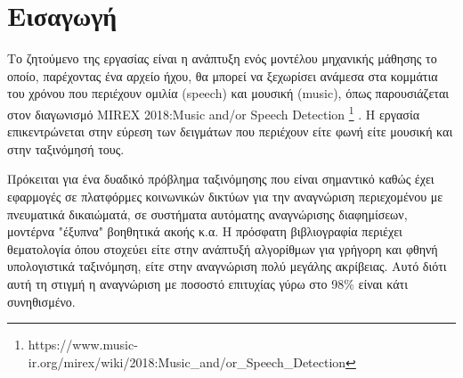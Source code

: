 \section{Εισαγωγή}

Το ζητούμενο της εργασίας είναι η ανάπτυξη ενός μοντέλου μηχανικής
μάθησης το οποίο, παρέχοντας ένα αρχείο ήχου, θα μπορεί να ξεχωρίσει
ανάμεσα στα κομμάτια του χρόνου που περιέχουν ομιλία (speech) και
μουσική (music), όπως παρουσιάζεται στον διαγωνισμό MIREX 2018:Music and/or Speech Detection 
\footnote{https://www.music-ir.org/mirex/wiki/2018:Music\_and/or\_Speech\_Detection} .
Η εργασία επικεντρώνεται στην εύρεση των δειγμάτων που περιέχουν είτε φωνή είτε μουσική
και στην ταξινόμησή τους.

Πρόκειται για ένα δυαδικό πρόβλημα ταξινόμησης που είναι σημαντικό καθώς έχει
εφαρμογές σε πλατφόρμες κοινωνικών δικτύων για την αναγνώριση
περιεχομένου με πνευματικά δικαιώματά, σε συστήματα αυτόματης
αναγνώρισης διαφημίσεων, μοντέρνα "έξυπνα" βοηθητικά ακοής κ.α. Η
πρόσφατη βιβλιογραφία περιέχει θεματολογία όπου στοχεύει είτε στην
ανάπτυξή αλγορίθμων για γρήγορη και φθηνή υπολογιστικά ταξινόμηση,
είτε στην αναγνώριση πολύ μεγάλης ακρίβειας. Αυτό διότι αυτή τη
στιγμή η αναγνώριση με ποσοστό επιτυχίας γύρω στο 98\% είναι κάτι
συνηθισμένο.